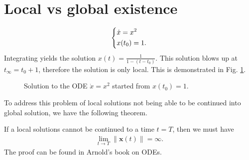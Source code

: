 \section{Local vs global existence}
\begin{ex}
	\begin{align}
		\begin{dcases}
			\dot{x} = x^2 \\
			x(t_0) = 1.
		\end{dcases}
	\end{align}
	Integrating yields the solution $x(t) = \frac{1}{1 - (t-t_0)}$. This solution blows up at $t_{\infty }=t_0 + 1$, therefore the solution is only local. This is demonstrated in Fig. \ref{fig:exploding_solution}.	
\begin{figure}[h!]
\centering	
{}
\caption{Solution to the ODE $\dot{x}=x^2$ started from $x(t_0)=1$.}
	\label{fig:exploding_solution}
\end{figure}
\end{ex}
To address this problem of local solutions not being able to be continued into global solution, we have the following theorem.
\begin{theorem}
	If a local solutions cannot be continued to a time $t=T$, then we must have
	\begin{align}
		\boxed{\lim_{t\to T}  \| \textbf{x}(t) \|= \infty.}
	\end{align}
The proof can be found in Arnold's book on ODEs.	
\end{theorem}

